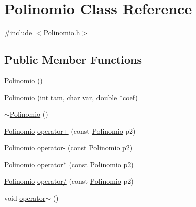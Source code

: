 \hypertarget{class_polinomio}{\section{Polinomio Class Reference}
\label{class_polinomio}
}


{\ttfamily \#include $<$Polinomio.\+h$>$}

\subsection*{Public Member Functions}
\begin{DoxyCompactItemize}
\item 
\hyperlink{class_polinomio_ac910fd7c555f384a2b12a8f498acd2f4}{Polinomio} ()
\item 
\hyperlink{class_polinomio_a7c1211aa14031169f101ac9feb3f7e29}{Polinomio} (int \hyperlink{class_polinomio_a4e1570a5d708ee593dd835fd886762f4}{tam}, char \hyperlink{class_polinomio_ac2471ef9aad80fb06f9ab99086d04af4}{var}, double $\ast$\hyperlink{class_polinomio_a14c45ccfc7450fb0fed2e5e6f45afb54}{coef})
\item 
\hyperlink{class_polinomio_a1023ada36c95fce6698316a632fdcc1c}{$\sim$\+Polinomio} ()
\item 
\hyperlink{class_polinomio}{Polinomio} \hyperlink{class_polinomio_a833b3913b53c14b6e7f3e39c908e0c5c}{operator+} (const \hyperlink{class_polinomio}{Polinomio} p2)
\item 
\hyperlink{class_polinomio}{Polinomio} \hyperlink{class_polinomio_a8315f494b84098d0c99e97e5b1acb413}{operator-\/} (const \hyperlink{class_polinomio}{Polinomio} p2)
\item 
\hyperlink{class_polinomio}{Polinomio} \hyperlink{class_polinomio_ad51ca40076a0aab3945e7d7d78f95bc2}{operator$\ast$} (const \hyperlink{class_polinomio}{Polinomio} p2)
\item 
\hyperlink{class_polinomio}{Polinomio} \hyperlink{class_polinomio_a141bc34ae9d7fae564ef6cc56669b3fd}{operator/} (const \hyperlink{class_polinomio}{Polinomio} p2)
\item 
void \hyperlink{class_polinomio_a3433445a715a473c4dd433e1d1248406}{operator$\sim$} ()
\end{DoxyCompactItemize}
